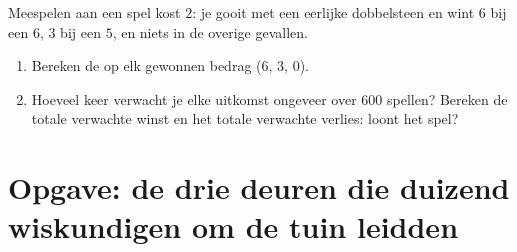 \begin{exercise}[$\star\star\star$]\label{exo:g10:proba:9}
Meespelen aan een spel kost $2$: je gooit met een eerlijke dobbelsteen en
wint $6$ bij een $6$, $3$ bij een $5$, en niets in de overige gevallen.
\begin{enumerate}
  \item Bereken de  op elk gewonnen bedrag ($6$, $3$, $0$).
  \item Hoeveel keer verwacht je elke uitkomst ongeveer over $600$ spellen?
        Bereken de totale verwachte winst en het totale verwachte verlies:
        loont het spel?
\end{enumerate}
\end{exercise}

\section{Opgave: de drie deuren die duizend wiskundigen om de tuin leidden}

